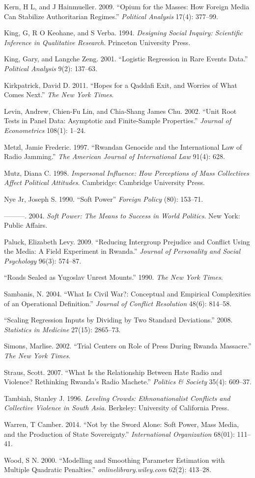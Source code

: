\documentclass[11pt,article,oneside]{memoir}
\begin{document}
Kern, H L, and J Hainmueller. 2009. ``Opium for the Masses: How Foreign
Media Can Stabilize Authoritarian Regimes.'' \emph{Political Analysis}
17(4): 377--99.

King, G, R O Keohane, and S Verba. 1994. \emph{Designing Social Inquiry:
Scientific Inference in Qualitative Research}. Princeton University
Press.

King, Gary, and Langche Zeng. 2001. ``Logistic Regression in Rare Events
Data.'' \emph{Political Analysis} 9(2): 137--63.

Kirkpatrick, David D. 2011. ``Hopes for a Qaddafi Exit, and Worries of
What Comes Next.'' \emph{The New York Times}.

Levin, Andrew, Chien-Fu Lin, and Chia-Shang James Chu. 2002. ``Unit Root
Tests in Panel Data: Asymptotic and Finite-Sample Properties.''
\emph{Journal of Econometrics} 108(1): 1--24.

Metzl, Jamie Frederic. 1997. ``Rwandan Genocide and the International
Law of Radio Jamming.'' \emph{The American Journal of International Law}
91(4): 628.

Mutz, Diana C. 1998. \emph{Impersonal Influence: How Perceptions of Mass
Collectives Affect Political Attitudes}. Cambridge: Cambridge University
Press.

Nye Jr, Joseph S. 1990. ``Soft Power'' \emph{Foreign Policy} (80):
153--71.

---------. 2004. \emph{Soft Power: The Means to Success in World
Politics}. New York: Public Affairs.

Paluck, Elizabeth Levy. 2009. ``Reducing Intergroup Prejudice and
Conflict Using the Media: A Field Experiment in Rwanda.'' \emph{Journal
of Personality and Social Psychology} 96(3): 574--87.

``Roads Sealed as Yugoslav Unrest Mounts.'' 1990. \emph{The New York
Times}.

Sambanis, N. 2004. ``What Is Civil War?: Conceptual and Empirical
Complexities of an Operational Definition.'' \emph{Journal of Conflict
Resolution} 48(6): 814--58.

``Scaling Regression Inputs by Dividing by Two Standard Deviations.''
2008. \emph{Statistics in Medicine} 27(15): 2865--73.

Simons, Marlise. 2002. ``Trial Centers on Role of Press During Rwanda
Massacre.'' \emph{The New York Times}.

Straus, Scott. 2007. ``What Is the Relationship Between Hate Radio and
Violence? Rethinking Rwanda's Radio Machete.'' \emph{Politics \&
Society} 35(4): 609--37.

Tambiah, Stanley J. 1996. \emph{Leveling Crowds: Ethnonationalist
Conflicts and Collective Violence in South Asia}. Berkeley: University
of California Press.

Warren, T Camber. 2014. ``Not by the Sword Alone: Soft Power, Mass
Media, and the Production of State Sovereignty.'' \emph{International
Organization} 68(01): 111--41.

Wood, S N. 2000. ``Modelling and Smoothing Parameter Estimation with
Multiple Quadratic Penalties.'' \emph{onlinelibrary.wiley.com} 62(2):
413--28.
\end{document}
